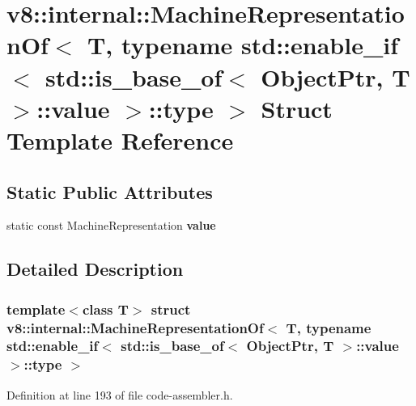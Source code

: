 \hypertarget{structv8_1_1internal_1_1MachineRepresentationOf_3_01T_00_01typename_01std_1_1enable__if_3_01std_63dc9825ccfede57893e0c8dd48ca7f9}{}\section{v8\+:\+:internal\+:\+:Machine\+Representation\+Of$<$ T, typename std\+:\+:enable\+\_\+if$<$ std\+:\+:is\+\_\+base\+\_\+of$<$ Object\+Ptr, T $>$\+:\+:value $>$\+:\+:type $>$ Struct Template Reference}
\label{structv8_1_1internal_1_1MachineRepresentationOf_3_01T_00_01typename_01std_1_1enable__if_3_01std_63dc9825ccfede57893e0c8dd48ca7f9}
\subsection*{Static Public Attributes}
\begin{DoxyCompactItemize}
\item 
static const Machine\+Representation {\bfseries value}
\end{DoxyCompactItemize}


\subsection{Detailed Description}
\subsubsection*{template$<$class T$>$\newline
struct v8\+::internal\+::\+Machine\+Representation\+Of$<$ T, typename std\+::enable\+\_\+if$<$ std\+::is\+\_\+base\+\_\+of$<$ Object\+Ptr, T $>$\+::value $>$\+::type $>$}



Definition at line 193 of file code-\/assembler.\+h.



